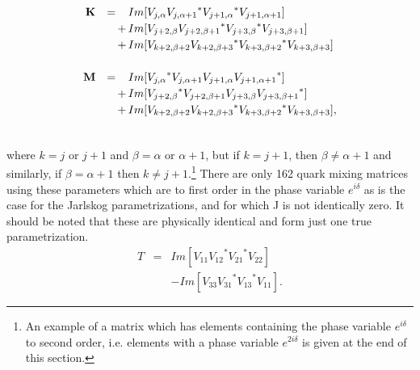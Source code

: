 \documentclass{moriond}
\def\bea{\begin{eqnarray}}
\def\eea{\end{eqnarray}}
\begin{document}
\begin{equation}
\renewcommand{\arraystretch}{1.2}
\begin{array}{rc@{\,}c@{\,}l}

\bf{K} & = &&  Im[V_{j, \alpha} {V_{j,\alpha + 1}}^*
{V_{j + 1,\alpha }}^* V_{j + 1, \alpha + 1} ] \\
       &   & + & Im[V_{j + 2, \beta} {V_{j + 2,\beta + 1}}^*
{V_{j + 3,\beta }}^* V_{j + 3, \beta + 1} ]  \\
       &   & + & Im[V_{k + 2, \beta + 2} {V_{k + 2,\beta + 3}}^*
{V_{k + 3,\beta + 2 }}^* V_{k + 3, \beta + 3}] \\
& & \\
\bf{M} & = &&  Im[{V_{j, \alpha}}^* V_{j,\alpha + 1}
V_{j + 1,\alpha } {V_{j + 1, \alpha + 1}}^* ]  \\
       &   & + & Im[{V_{j + 2, \beta}}^* V_{j + 2,\beta + 1}
V_{j + 3,\beta } {V_{j + 3, \beta + 1}}^* ]  \\
       &   & + & Im[V_{k + 2, \beta + 2} {V_{k + 2,\beta + 3}}^*
{V_{k + 3,\beta + 2 }}^* V_{k + 3, \beta + 3}],
\\ & &
\end{array}
\label{eq:spa}
\end{equation}

where $ k = j$ or $j+1$ and $\beta = \alpha$ or $\alpha+1$, but if
$k = j + 1$, then $\beta \neq \alpha + 1$ and similarly, if
$\beta = \alpha + 1$ then $ k \neq j + 1$.\footnote{An example of a
matrix which has elements
containing the phase variable $e^{i \delta}$ to second order, i.e.
elements with a
phase variable $e^{2i \delta}$ is given at the end of this section.}
   There are only 162 quark mixing matrices using these parameters
which are
to first order in the phase variable $e^{i \delta}$ as is the case for
the Jarlskog parametrizations, and for which J is not identically
zero.
It should be noted that these are physically identical and
form just one true parametrization.
\bea
T & = & Im[V_{11} {V_{12}}^* {V_{21}}^* V_{22}]  \nonumber \\
&  & - Im[V_{33} {V_{31}}^* {V_{13}}^* V_{11}].
\label{eq:sp}
\eea
\end{document}
